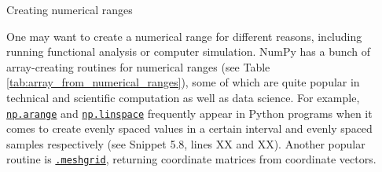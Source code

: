 \documentclass[a4paper,11pt]{book}
\newcommand{\question}[1]{%
    \begin{tcolorbox}[colback=comp_c!10,colframe=comp_c,sidebyside align=top,width=\linewidth,before skip=1ex]
        #1
    \end{tcolorbox}
    \switchcolumn%
}
\newcommand{\note}[1]{%
    \begin{tcolorbox}[colback=white!0,colframe=white!10,width=\linewidth,before skip=1ex]
        #1
    \end{tcolorbox}
}
\begin{document}
\begin{paracol}{2}
	\question{\raggedright Creating numerical ranges}
	\note{One may want to create a numerical range for different reasons, including running functional analysis or computer simulation. NumPy has a bunch of array-creating routines for numerical ranges (see Table \ref{tab:array_from_numerical_ranges}), some of which are quite popular in technical and scientific computation as well as data science. For example, \href{https://numpy.org/doc/stable/reference/generated/numpy.arange.html\#numpy.arange}{\texttt{np.arange}} and \href{https://numpy.org/doc/stable/reference/generated/numpy.linspace.html\#numpy.linspace}{\texttt{np.linspace}} frequently appear in Python programs when it comes to create evenly spaced values in a certain interval and evenly spaced samples respectively (see Snippet 5.8, lines XX and XX). Another popular routine is \href{https://numpy.org/doc/stable/reference/generated/numpy.meshgrid.html\#numpy.meshgrid}{\texttt{.meshgrid}}, returning coordinate matrices from coordinate vectors.}
\end{paracol}
\end{document}
